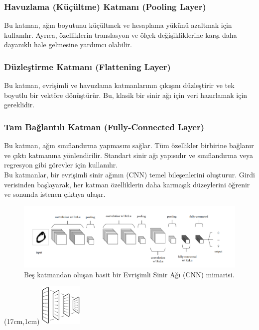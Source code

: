 \documentclass{article}
\begin{document}
\subsubsection{Havuzlama (Küçültme) Katmanı (Pooling Layer)}
Bu katman, ağın boyutunu küçültmek ve hesaplama yükünü azaltmak için kullanılır. Ayrıca, özelliklerin translasyon ve ölçek değişikliklerine karşı daha dayanıklı hale gelmesine yardımcı olabilir.

\subsubsection{Düzleştirme Katmanı (Flattening Layer)}
Bu katman, evrişimli ve havuzlama katmanlarının çıkışını düzleştirir ve tek boyutlu bir vektöre dönüştürür. Bu, klasik bir sinir ağı için veri hazırlamak için gereklidir.
\subsubsection{Tam Bağlantılı Katman (Fully-Connected Layer)}
 Bu katman, ağın sınıflandırma yapmasını sağlar. Tüm özellikler birbirine bağlanır ve çıktı katmanına yönlendirilir. Standart sinir ağı yapısıdır ve sınıflandırma veya regresyon gibi görevler için kullanılır.\\[5pt]

\noindent Bu katmanlar, bir evrişimli sinir ağının (CNN) temel bileşenlerini oluşturur. Girdi verisinden başlayarak, her katman özelliklerin daha karmaşık düzeylerini öğrenir ve sonunda istenen çıktıya ulaşır.\\[5pt]

\begin{figure}[h]
  \centering
  \includegraphics[width=1.1\textwidth]{image/Resim57.PNG} %
\caption{
Beş katmandan oluşan basit bir Evrişimli Sinir Ağı (CNN) mimarisi.\cite{o2015introduction}}
  \label{fig:cnn}  
\end{figure}





\newpage
\begin{textblock*}{5cm}(17cm,1cm) %
    \includegraphics[width=2cm]{image/Resim45.png} %
\end{textblock*}
\end{document}

